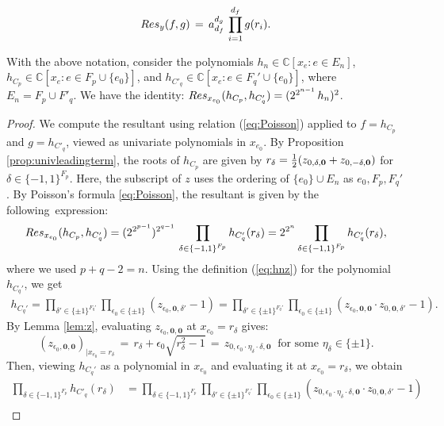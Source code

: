 \documentclass[10pt,a4paper]{amsart}
\newcommand{\azero}{\mathbf{0}}
\begin{document}
\begin{equation} \label{eq:Poisson}
{\rm Res}_y(f,g) \, = \, a_{d_f}^{d_g} \, \prod_{i = 1}^{d_f} g(r_i).
\end{equation}

\begin{proposition} \label{prop:Resh}
With the above notation, consider the polynomials $h_n \in \mathbb{C}[x_e  :  e \in E_n]$, $h_{C_p} \in \mathbb{C}[x_e : e \in F_p\cup\{e_0\}]$, and $h_{C'_q} \in \mathbb{C}[x_e  :  e \in F_q'\cup\{e_0\}]$,  where $E_n=F_p\cup F'_q$. 
We have the identity: ${\rm Res}_{x_{e_0}}(h_{C_p}, h_{C'_q}) = (2^{2^{n-1}} \, h_n)^2$. 
\end{proposition}

\begin{proof}
We compute the resultant using relation (\ref{eq:Poisson}) applied to $f= h_{C_p}$ and $g=h_{C'_q}$, viewed as univariate polynomials in $x_{e_0}$.
By Proposition \ref{prop:univleadingterm}, the roots of $h_{C_p}$ 
are given by 
$r_\delta={1\over 2}(z_{0,\delta,\azero}+z_{0,-\delta,\azero})$ for $ \delta \in \{-1,1\}^{F_p}.$
Here, the subscript of $z$ uses the   ordering of $\{e_0\} \cup E_n$ as $e_0, F_p, F_q'$. 
By Poisson's formula \eqref{eq:Poisson}, the resultant is given by the following~expression:
\[
{\rm Res}_{x_{e_0}}(h_{C_p}, h_{C_q'})= (2^{2^{p-1}})^{2^{q-1}} \, \prod_{\delta \in \{-1,1\}^{F_p}}  h_{C'_q}(r_\delta)=
2^{2^n} \prod_{\delta \in \{-1,1\}^{F_p}}  h_{C'_q}(r_\delta),  \]
where we used $p + q - 2 = n$. Using the definition (\ref{eq:hnz}) for the polynomial $h_{C_q'}$, we get
\begin{align*}
h_{C_q'}= \prod_{\delta'\in\{\pm 1\}^{F_q'}} \prod_{\epsilon_0\in \{\pm 1\}} (z_{\epsilon_0,\azero,\delta'}-1) = 
 \prod_{\delta'\in\{\pm 1\}^{F_q'}} \prod_{\epsilon_0\in \{\pm 1\}} (z_{\epsilon_0,\azero,\azero}\cdot z_{0,\azero,\delta'}-1).
 \end{align*}
By Lemma \ref{lem:z}, evaluating $z_{\epsilon_0,\azero,\azero}$ at $x_{e_0}=r_\delta$ gives:
\[
(z_{\epsilon_0,\azero,\azero})_{|x_{e_0} = r_\delta} \,=\, r_{\delta}+\epsilon_0\sqrt{r_\delta^2-1} \,= \,z_{0,\epsilon_0\cdot \eta_\delta\cdot  \delta,\azero}\ \text{   for some } \eta_\delta\in\{\pm 1\}.
\]
Then, viewing $h_{C_q'}$ as a polynomial in $x_{e_0}$ and evaluating it at $x_{e_0}=r_\delta$, 
   we obtain 
\begin{align*}
\prod_{\delta \in \{-1,1\}^{F_p}}  h_{C'_q}(r_\delta)& =
\prod_{\delta \in \{-1,1\}^{F_p}}  \prod_{\delta'\in\{\pm 1\}^{F_q'}}\prod_{\epsilon_0\in \{\pm 1\}}
(z_{0,\epsilon_0\cdot \eta_\delta\cdot  \delta,\azero}\cdot z_{0,\azero,\delta'}-1)\\

\end{align*}
\end{proof}
\end{document}
